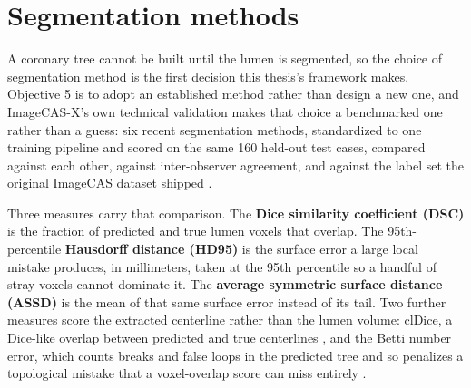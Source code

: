 %
%

\section{Segmentation methods}
\label{sec:segmentation}

A coronary tree cannot be built until the lumen is segmented, so the choice of segmentation
method is the first decision this thesis's framework makes.
Objective 5 is to adopt an established method rather than design a new one, and ImageCAS-X's own
technical validation makes that choice a benchmarked one rather than a guess: six recent
segmentation methods, standardized to one training pipeline and scored on the same 160 held-out
test cases, compared against each other, against inter-observer agreement, and against the label
set the original ImageCAS dataset shipped \cite{bransby2026imagecasx}.

Three measures carry that comparison.
The \textbf{Dice similarity coefficient (DSC)} is the fraction of predicted and true lumen voxels
that overlap.
The 95th-percentile \textbf{Hausdorff distance (HD95)} is the surface error a large local mistake
produces, in millimeters, taken at the 95th percentile so a handful of stray voxels cannot dominate
it.
The \textbf{average symmetric surface distance (ASSD)} is the mean of that same surface error
instead of its tail.
Two further measures score the extracted centerline rather than the lumen volume: clDice, a
Dice-like overlap between predicted and true centerlines \cite{shit2021cldice}, and the Betti
number error, which counts breaks and false loops in the predicted tree and so penalizes a
topological mistake that a voxel-overlap score can miss entirely
\cite{bransby2026imagecasx}.

